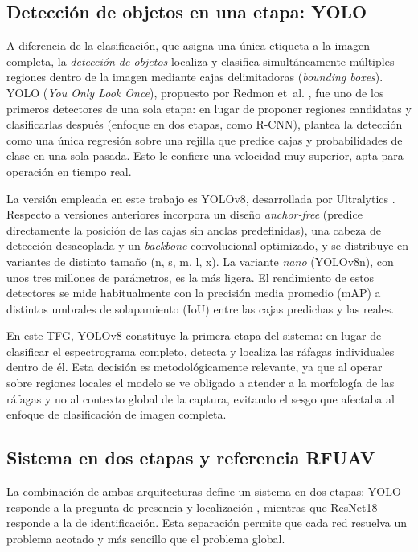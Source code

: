\subsection{Detección de objetos en una etapa: YOLO}
\label{subsec:yolo}

A diferencia de la clasificación, que asigna una única etiqueta a la imagen completa, la \emph{detección de objetos} localiza y clasifica simultáneamente múltiples regiones dentro de la imagen mediante cajas delimitadoras (\emph{bounding boxes}). YOLO (\emph{You Only Look Once}), propuesto por Redmon et~al. \cite{redmon2016yolo}, fue uno de los primeros detectores de una sola etapa: en lugar de proponer regiones candidatas y clasificarlas después (enfoque en dos etapas, como R-CNN), plantea la detección como una única regresión sobre una rejilla que predice cajas y probabilidades de clase en una sola pasada. Esto le confiere una velocidad muy superior, apta para operación en tiempo real.

La versión empleada en este trabajo es YOLOv8, desarrollada por Ultralytics \cite{jocher2023yolov8}. Respecto a versiones anteriores incorpora un diseño \emph{anchor-free} (predice directamente la posición de las cajas sin anclas predefinidas), una cabeza de detección desacoplada y un \emph{backbone} convolucional optimizado, y se distribuye en variantes de distinto tamaño (n, s, m, l, x). La variante \emph{nano} (YOLOv8n), con unos tres millones de parámetros, es la más ligera. El rendimiento de estos detectores se mide habitualmente con la precisión media promedio (mAP) a distintos umbrales de solapamiento (IoU) entre las cajas predichas y las reales.

En este TFG, YOLOv8 constituye la primera etapa del sistema: en lugar de clasificar el espectrograma completo, detecta y localiza las ráfagas individuales dentro de él. Esta decisión es metodológicamente relevante, ya que al operar sobre regiones locales el modelo se ve obligado a atender a la morfología de las ráfagas y no al contexto global de la captura, evitando el sesgo que afectaba al enfoque de clasificación de imagen completa.

\subsection{Sistema en dos etapas y referencia RFUAV}
\label{subsec:two_stage_rfuav}

La combinación de ambas arquitecturas define un sistema en dos etapas: YOLO responde a la pregunta de presencia y localización , mientras que ResNet18 responde a la de identificación. Esta separación permite que cada red resuelva un problema acotado y más sencillo que el problema global.

